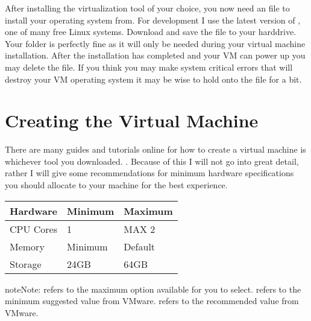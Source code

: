 \documentclass[letterpaper,10pt,english]{sphinxmanual}
\begin{document}
After installing the virtualization tool of your choice, you now need an  file to install your operating
system from. For development I use the latest version of , one of many free Linux systems. Download and save the  file to your
hard\sphinxhyphen{}drive. Your  folder is perfectly fine as it will only be needed during your virtual machine
installation. After the installation has completed and your VM can power up you may delete the  file. If
you think you may make system critical errors that will destroy your VM operating system it may be wise to hold onto
the  file for a bit.


\section{Creating the Virtual Machine}
\label{\detokenize{newuser:creating-the-virtual-machine}}
There are many guides and tutorials online for how to create a virtual machine is whichever tool you downloaded.
.
Because of this I will not go into great detail, rather I will give some recommendations for minimum hardware
specifications you should allocate to your machine for the best experience.


\begin{savenotes}\sphinxattablestart
\centering
\begin{tabulary}{\linewidth}[t]{|T|T|T|}
\hline

Hardware
&
Minimum
&
Maximum
\\
\hline
CPU Cores
&
1
&
MAX \sphinxhyphen{} 2
\\
\hline
Memory
&
Minimum
&
Default
\\
\hline
Storage
&
24GB
&
64GB
\\
\hline
\end{tabulary}
\par
\sphinxattableend\end{savenotes}

\begin{sphinxadmonition}{note}{Note:}
 refers to the maximum option available for you to select.  refers to the minimum
suggested value from VMware.  refers to the recommended value from VMware.
\end{sphinxadmonition}
\end{document}
